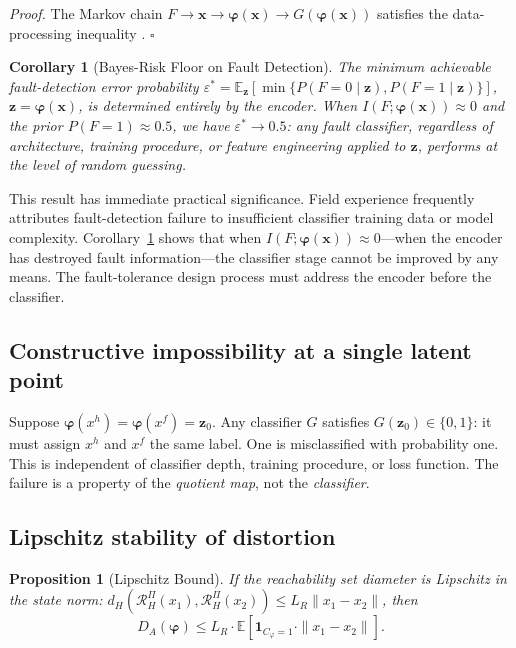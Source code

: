 \documentclass[10pt,twocolumn]{article}
\theoremstyle{plain}
\newtheorem{proposition}{Proposition}
\newtheorem{corollary}{Corollary}
\theoremstyle{definition}
\theoremstyle{remark}
\newcommand{\DA}{D_{A}(\bm{\varphi})}
\newcommand{\RHP}{\mathcal{R}_{H}^{\Pi}}
\newcommand{\bvphi}{\bm{\varphi}}
\newcommand{\E}{\mathbb{E}}
\begin{document}
\textit{Proof.} The Markov chain $F \to \bm{x} \to \bvphi(\bm{x}) \to
G(\bvphi(\bm{x}))$ satisfies the data-processing inequality
\citep{cover2006elements}. $\square$

\begin{corollary}[Bayes-Risk Floor on Fault Detection]
\label{cor:bayes}
The minimum achievable fault-detection error probability
$\varepsilon^* = \E_{\bm{z}}[\min\{P(F=0\mid\bm{z}),P(F=1\mid\bm{z})\}]$,
$\bm{z} = \bvphi(\bm{x})$, is determined entirely by the encoder. When
$I(F;\bvphi(\bm{x})) \approx 0$ and the prior $P(F=1) \approx 0.5$,
we have $\varepsilon^* \to 0.5$: any fault classifier, regardless of
architecture, training procedure, or feature engineering applied to
$\bm{z}$, performs at the level of random guessing.
\end{corollary}

This result has immediate practical significance. Field experience frequently
attributes fault-detection failure to insufficient classifier training data
or model complexity. Corollary~\ref{cor:bayes} shows that when
$I(F;\bvphi(\bm{x})) \approx 0$---when the encoder has destroyed fault
information---the classifier stage cannot be improved by any means. The
fault-tolerance design process must address the encoder before the classifier.

\subsection{Constructive impossibility at a single latent point}

Suppose $\bvphi(x^h) = \bvphi(x^f) = \bm{z}_0$. Any classifier $G$
satisfies $G(\bm{z}_0) \in \{0,1\}$: it must assign $x^h$ and $x^f$ the
same label. One is misclassified with probability one. This is independent
of classifier depth, training procedure, or loss function. The failure is
a property of the \emph{quotient map}, not the \emph{classifier}.

\subsection{Lipschitz stability of distortion}

\begin{proposition}[Lipschitz Bound]
\label{prop:lip}
If the reachability set diameter is Lipschitz in the state norm:
$d_H(\RHP(x_1),\RHP(x_2)) \leq L_R \|x_1 - x_2\|$, then
\begin{equation}
  \DA \leq L_R \cdot \E\!\left[
    \mathbf{1}_{C_\varphi=1} \cdot \|x_1 - x_2\|
  \right].
  \label{eq:lip}
\end{equation}
\end{proposition}
\end{document}

